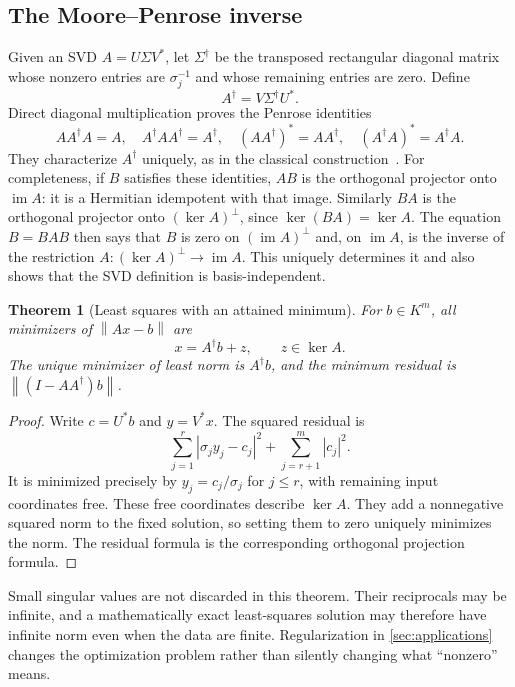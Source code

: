 \documentclass[11pt,a4paper]{article}
\numberwithin{equation}{section}
\newtheorem{theorem}{Theorem}[section]
\theoremstyle{definition}
\theoremstyle{remark}
\newcommand{\im}{\operatorname{im}}
\newcommand{\norm}[1]{\left\lVert#1\right\rVert}
\begin{document}
\subsection{The Moore--Penrose inverse}
Given an SVD $A=U\Sigma V^*$, let $\Sigma^\dagger$ be the transposed
rectangular diagonal matrix whose nonzero entries are $\sigma_j^{-1}$ and
whose remaining entries are zero. Define
\[
 A^\dagger=V\Sigma^\dagger U^*.
\]
Direct diagonal multiplication proves the Penrose identities
\begin{equation}\label{eq:penrose}
 AA^\dagger A=A,\quad A^\dagger AA^\dagger=A^\dagger,
 \quad(AA^\dagger)^*=AA^\dagger,\quad(A^\dagger A)^*=A^\dagger A.
\end{equation}
They characterize $A^\dagger$ uniquely, as in the classical
construction~\cite{Penrose}. For completeness, if $B$ satisfies these
identities, $AB$ is the orthogonal projector onto $\im A$: it is a
Hermitian idempotent with that image. Similarly $BA$ is the orthogonal
projector onto $(\ker A)^\perp$, since $\ker(BA)=\ker A$. The equation
$B=BAB$ then says that $B$ is zero on $(\im A)^\perp$ and, on $\im A$,
is the inverse of the restriction
$A:(\ker A)^\perp\to\im A$. This uniquely determines it and also shows
that the SVD definition is basis-independent.

\begin{theorem}[Least squares with an attained minimum]\label{thm:leastsquares}
For $b\in K^m$, all minimizers of $\norm{Ax-b}$ are
\[
 x=A^\dagger b+z,\qquad z\in\ker A.
\]
The unique minimizer of least norm is $A^\dagger b$, and the minimum residual
is $\norm{(I-AA^\dagger)b}$.
\end{theorem}
\begin{proof}
Write $c=U^*b$ and $y=V^*x$. The squared residual is
\[
 \sum_{j=1}^r|\sigma_j y_j-c_j|^2+\sum_{j=r+1}^m|c_j|^2.
\]
It is minimized precisely by $y_j=c_j/\sigma_j$ for $j\le r$, with
remaining input coordinates free. These free coordinates describe
$\ker A$. They add a nonnegative squared norm to the fixed solution, so
setting them to zero uniquely minimizes the norm. The residual formula is
the corresponding orthogonal projection formula.
\end{proof}

Small singular values are not discarded in this theorem. Their reciprocals
may be infinite, and a mathematically exact least-squares solution may
therefore have infinite norm even when the data are finite. Regularization
in \cref{sec:applications} changes the optimization problem rather than
silently changing what ``nonzero'' means.
\end{document}
